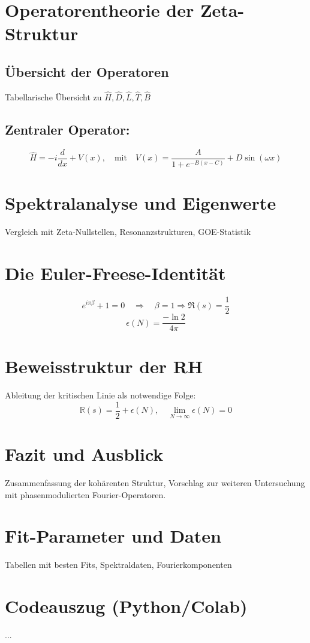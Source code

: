 \documentclass[12pt]{article}
\begin{document}
\section{Operatorentheorie der Zeta-Struktur}
\subsection{Übersicht der Operatoren}
Tabellarische Übersicht zu \( \hat{H}, \hat{D}, \hat{L}, \hat{T}, \hat{B} \)

\subsection{Zentraler Operator:}
\[
\hat{H} = -i \frac{d}{dx} + V(x), \quad \text{mit} \quad V(x) = \frac{A}{1 + e^{-B(x - C)}} + D \sin(\omega x)
\]

\section{Spektralanalyse und Eigenwerte}
Vergleich mit Zeta-Nullstellen, Resonanzstrukturen, GOE-Statistik

\section{Die Euler-Freese-Identität}
\[
e^{i \pi \beta} + 1 = 0 \quad \Rightarrow \quad \beta = 1 \Rightarrow \Re(s) = \frac{1}{2}
\]
\[
\epsilon(N) = \frac{-\ln 2}{4\pi}
\]

\section{Beweisstruktur der RH}
Ableitung der kritischen Linie als notwendige Folge:
\[
\mathbb{R}(s) = \frac{1}{2} + \epsilon(N), \quad \lim_{N \to \infty} \epsilon(N) = 0
\]

\section{Fazit und Ausblick}
Zusammenfassung der kohärenten Struktur, Vorschlag zur weiteren Untersuchung mit phasenmodulierten Fourier-Operatoren.

\appendix
\section{Fit-Parameter und Daten}
Tabellen mit besten Fits, Spektraldaten, Fourierkomponenten

\section{Codeauszug (Python/Colab)}
...
\end{document}
